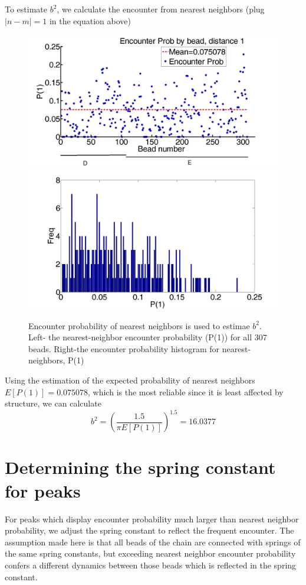 \documentclass[12pt]{book}
\begin{document}
To estimate $b^2$, we calculate the encounter from nearest neighbors (plug $|n-m|=1$ in the equation above)
\begin{figure}[H]
\includegraphics[scale=0.1]{encoutnerProbByDist307BeadsAverageData}
\includegraphics[scale=0.1]{encounterProbHistogramDist1}
\caption{\scriptsize{Encounter probability of nearest neighbors is used to estimae $b^2$. Left- the nearest-neighbor encounter probability (P(1)) for all 307 beads. Right-the encounter probability histogram for nearest-neighbors, P(1)}}\label{figure_nearestNeighborProb}
\end{figure}
Using the estimation of the expected probability of nearest neighbors $E[P(1)]=0.075078$, which is the most reliable since it is least affected by structure, we can calculate
\begin{equation*}
b^2 = \left(\frac{1.5}{\pi E[P(1)]}\right)^{1.5}=16.0377
\end{equation*}

\section{Determining the spring constant for peaks} 
For peaks which display encounter probability much larger than nearest neighbor probability, we adjust the spring constant to reflect the frequent encounter. The assumption made here is that all beads of the chain are connected with springs of the same spring constants, but exceeding nearest neighbor encounter probability confers a different dynamics between those beads which is reflected in the spring constant.
\end{document}
